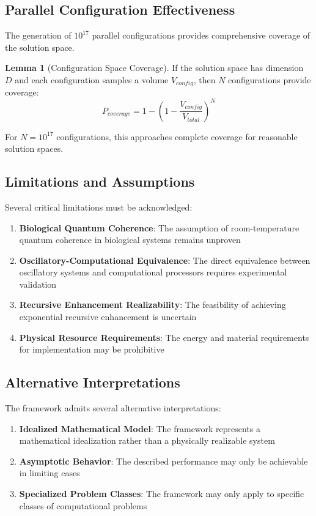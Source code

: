 \documentclass[12pt,a4paper]{article}
\theoremstyle{definition}
\newtheorem{lemma}{Lemma}[section]
\begin{document}
{\subsection{Parallel Configuration Effectiveness}

The generation of $10^{17}$ parallel configurations provides comprehensive coverage of the solution space.

\begin{lemma}[Configuration Space Coverage]
If the solution space has dimension $D$ and each configuration samples a volume $V_{config}$, then $N$ configurations provide coverage:
\begin{equation}
P_{coverage} = 1 - \left(1 - \frac{V_{config}}{V_{total}}\right)^N
\end{equation}
\end{lemma}

For $N = 10^{17}$ configurations, this approaches complete coverage for reasonable solution spaces.

\subsection{Limitations and Assumptions}

Several critical limitations must be acknowledged:

\begin{enumerate}
\item \textbf{Biological Quantum Coherence}: The assumption of room-temperature quantum coherence in biological systems remains unproven
\item \textbf{Oscillatory-Computational Equivalence}: The direct equivalence between oscillatory systems and computational processors requires experimental validation
\item \textbf{Recursive Enhancement Realizability}: The feasibility of achieving exponential recursive enhancement is uncertain
\item \textbf{Physical Resource Requirements}: The energy and material requirements for implementation may be prohibitive
\end{enumerate}

\subsection{Alternative Interpretations}

The framework admits several alternative interpretations:

\begin{enumerate}
\item \textbf{Idealized Mathematical Model}: The framework represents a mathematical idealization rather than a physically realizable system
\item \textbf{Asymptotic Behavior}: The described performance may only be achievable in limiting cases
\item \textbf{Specialized Problem Classes}: The framework may only apply to specific classes of computational problems
\end{enumerate}

}
\end{document}
